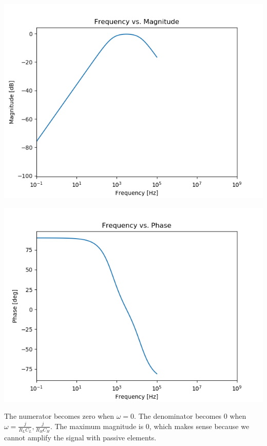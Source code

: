 \documentclass[]{article}
\begin{document}
\begin{center}
	\begin{minipage}{0.5\textwidth}
		\includegraphics[width=\linewidth]{3c_mag}
	\end{minipage}\hfill
	\begin{minipage}{0.5\textwidth}
		\includegraphics[width=\linewidth]{3c_phase}
	\end{minipage}
\end{center}
The numerator becomes zero when \(\omega = 0\).
The denominator becomes 0 when \(\omega = \frac{j}{R_L C_L}, \frac{j}{R_H C_H}\).
The maximum magnitude is 0, which makes sense because we cannot amplify the signal with passive elements.
\end{document}
